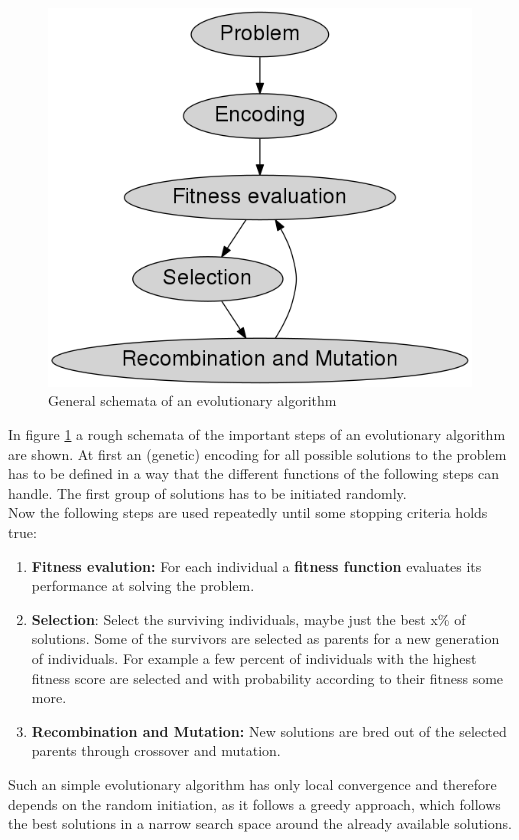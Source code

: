 \documentclass[12pt,twoside]{article}
\theoremstyle{plain}
\theoremstyle{definition}
\theoremstyle{remark}
\begin{document}
\begin{figure}
	\begin{center}
		\includegraphics[height=.4\textwidth]{Bilder/evo.png}
	\end{center}
	\caption{General schemata of an evolutionary algorithm}
	\label{fig:evo}
\end{figure}

In figure \ref{fig:evo} a rough schemata of the important steps of an evolutionary algorithm are shown. At first an (genetic) encoding for all possible solutions to the problem has to be defined in a way that the different functions of the following steps can handle. The first group of solutions has to be initiated randomly.\\

Now the following steps are used repeatedly until some stopping criteria holds true:
\begin{enumerate}
	\item \textbf{Fitness evalution:} For each individual a \textbf{fitness function} evaluates its performance at solving the problem.
	\item \textbf{Selection}: Select the surviving individuals, maybe just the best x\% of solutions. Some of the survivors are selected as parents for a new generation of individuals. For example a few percent of individuals with the highest fitness score are selected and with probability according to their fitness some more.
	\item \textbf{Recombination and Mutation:} New solutions are bred out of the selected parents through crossover and mutation.
\end{enumerate}

Such an simple evolutionary algorithm has only local convergence and therefore depends on the random initiation, as it follows a greedy approach, which follows the best solutions in a narrow search space around the already available solutions.
\end{document}
